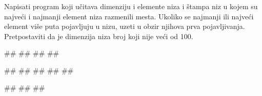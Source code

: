 \begin{Exercise}[label=p.razmena_min_max] 
Napisati program koji učitava dimenziju i elemente niza i štampa niz u kojem su najveći i najmanji element niza razmenili mesta. Ukoliko se najmanji ili najveći element više puta pojavljuju u nizu, uzeti u obzir njihova prva pojavljivanja. Pretpostaviti da je dimenzija niza broj koji nije veći od 100.  %

\begin{miditest}
\begin{upotreba}{1}
#\naslovInt#
##
##
##
\end{upotreba}
\end{miditest}
\begin{miditest}
\begin{upotreba}{2}
#\naslovInt#
##
##
##
##
\end{upotreba}
\end{miditest}

\begin{miditest}
\begin{upotreba}{3}
#\naslovInt#
##
##
\end{upotreba}
\end{miditest}
\end{Exercise}
\begin{Answer}[ref=p.razmena_min_max]
\end{Answer}


